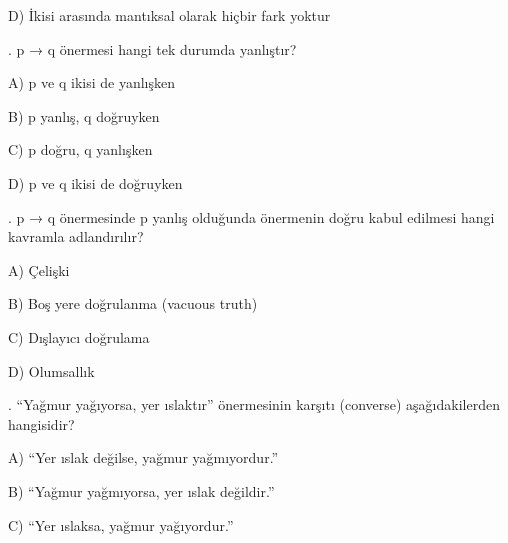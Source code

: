 \par\noindent\hspace*{1.6em}D) İkisi arasında mantıksal olarak hiçbir fark yoktur

\par\smallskip{}. p → q önermesi hangi tek durumda yanlıştır?

\par\noindent\hspace*{1.6em}A) p ve q ikisi de yanlışken

\par\noindent\hspace*{1.6em}B) p yanlış, q doğruyken

\par\noindent\hspace*{1.6em}C) p doğru, q yanlışken

\par\noindent\hspace*{1.6em}D) p ve q ikisi de doğruyken

\par\smallskip{}. p → q önermesinde p yanlış olduğunda önermenin doğru kabul edilmesi hangi kavramla adlandırılır?

\par\noindent\hspace*{1.6em}A) Çelişki

\par\noindent\hspace*{1.6em}B) Boş yere doğrulanma (vacuous truth)

\par\noindent\hspace*{1.6em}C) Dışlayıcı doğrulama

\par\noindent\hspace*{1.6em}D) Olumsallık

\par\smallskip{}. “Yağmur yağıyorsa, yer ıslaktır” önermesinin karşıtı (converse) aşağıdakilerden hangisidir?

\par\noindent\hspace*{1.6em}A) “Yer ıslak değilse, yağmur yağmıyordur.”

\par\noindent\hspace*{1.6em}B) “Yağmur yağmıyorsa, yer ıslak değildir.”

\par\noindent\hspace*{1.6em}C) “Yer ıslaksa, yağmur yağıyordur.”

